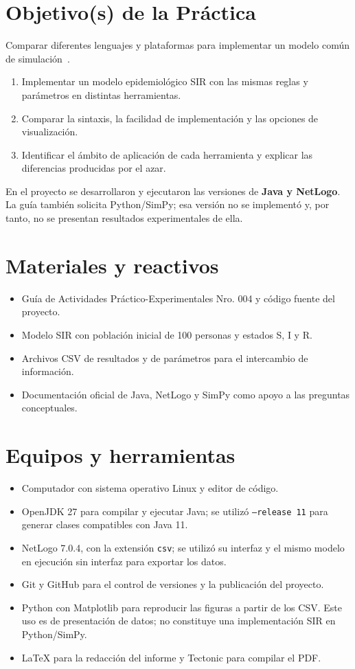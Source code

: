 \documentclass[11pt,a4paper]{article}
\begin{document}
\section{Objetivo(s) de la Práctica}
Comparar diferentes lenguajes y plataformas para implementar un modelo común de simulación~\cite{guia}.
\begin{enumerate}
  \item Implementar un modelo epidemiológico SIR con las mismas reglas y parámetros en distintas herramientas.
  \item Comparar la sintaxis, la facilidad de implementación y las opciones de visualización.
  \item Identificar el ámbito de aplicación de cada herramienta y explicar las diferencias producidas por el azar.
\end{enumerate}
En el proyecto se desarrollaron y ejecutaron las versiones de \textbf{Java y NetLogo}.
La guía también solicita Python/SimPy; esa versión no se implementó y, por tanto, no se presentan resultados experimentales de ella.

\section{Materiales y reactivos}
\begin{itemize}
  \item Guía de Actividades Práctico-Experimentales Nro. 004 y código fuente del proyecto.
  \item Modelo SIR con población inicial de 100 personas y estados S, I y R.
  \item Archivos CSV de resultados y de parámetros para el intercambio de información.
  \item Documentación oficial de Java, NetLogo y SimPy como apoyo a las preguntas conceptuales.
\end{itemize}

\section{Equipos y herramientas}
\begin{itemize}
  \item Computador con sistema operativo Linux y editor de código.
  \item OpenJDK 27 para compilar y ejecutar Java; se utilizó \texttt{--release 11} para generar clases compatibles con Java 11.
  \item NetLogo 7.0.4, con la extensión \texttt{csv}; se utilizó su interfaz y el mismo modelo en ejecución sin interfaz para exportar los datos.
  \item Git y GitHub para el control de versiones y la publicación del proyecto.
  \item Python con Matplotlib para reproducir las figuras a partir de los CSV. Este uso es de presentación de datos; no constituye una implementación SIR en Python/SimPy.
  \item \LaTeX{} para la redacción del informe y Tectonic para compilar el PDF.
\end{itemize}
\end{document}
